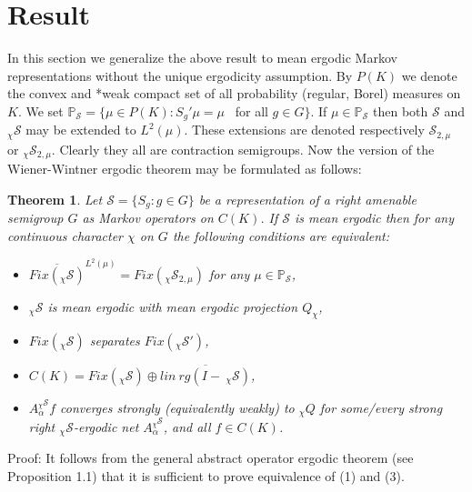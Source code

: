 \documentclass{amsart}
\newtheorem{thm}{Theorem}[section]
\theoremstyle{definition}
\theoremstyle{remark}
\numberwithin{equation}{section}
\begin{document}
\section{Result}

In this section we generalize the above result to mean ergodic Markov representations without the unique ergodicity assumption. By $P(K)$ we denote the convex and *weak compact set of all probability (regular, Borel) measures on $K$. We set $\mathbb{P}_{\mathcal{S}} = \{ \mu\in P(K) : S_g'\mu = \mu $ \ for all $g\in G \}$. If $\mu \in \mathbb{P}_{\mathcal{S}} $ then  both $\mathcal{S}$ and $_{\chi}\mathcal{S}$ may be extended to $L^2(\mu )$. These extensions are denoted respectively $\mathcal{S}_{2, \mu}$  or $_{\chi}\mathcal{S}_{2,\mu}$. Clearly they all are contraction semigroups. Now the version of the Wiener-Wintner ergodic theorem may be formulated as follows:
\begin{thm}
Let $\mathcal{S} = \{ S_g : g\in G \}$ be a representation of a right amenable semigroup $G$ as Markov operators on $C(K)$. If $\mathcal{S}$ is mean ergodic then for any continuous character $\chi $ on $G$ the following conditions are equivalent:
\begin{itemize}
\item[(1)] $\overline{Fix(_{\chi}\mathcal{S})}^{L^2(\mu)} = Fix(_{\chi}\mathcal{S}_{2,\mu})$ for any $\mu \in \mathbb{P}_{\mathcal{S}}$,
\item[(2)] $_{\chi}\mathcal{S}$ is mean ergodic with mean ergodic projection $Q_{\chi}$,
\item[(3)] $Fix(\mathcal{_{\chi}S})$ separates $Fix(_{\chi}\mathcal{S}')$,
\item[(4)] $C(K) = Fix(_{\chi}\mathcal{S})\oplus \overline{lin\ rg(I - \ _{\chi}\mathcal{S})} $,
\item[(5)] $A_{\alpha}^{_{\chi}\mathcal{S}}f$ converges strongly (equivalently weakly) to $_{\chi}Q$ for some/every strong right $_{\chi}\mathcal{S}$-ergodic net $A_{\alpha}^{_{\chi}\mathcal{S}}$, and all $f\in C(K)$.
\end{itemize}
\end{thm}

Proof: It follows from the general abstract operator ergodic theorem (see Proposition 1.1) that it is sufficient to prove equivalence of (1) and (3).
\end{document}
